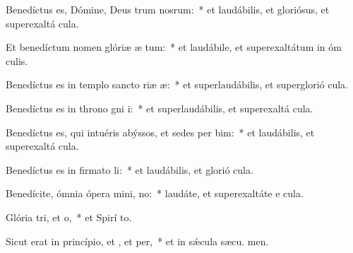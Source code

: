 \item Benedíctus es, Dómine, Deus trum nosrum:~* et laudábilis, et gloriósus, et superexaltá  cula.

\item Et benedíctum nomen glóriæ æ tum:~* et laudábile, et superexaltátum in óm culis.

\item Benedíctus es in templo sancto riæ æ:~* et superlaudábilis, et superglorió  cula.

\item Benedíctus es in throno gni i:~* et superlaudábilis, et superexaltá  cula.

\item Benedíctus es, qui intuéris abýssos, et sedes per bim:~* et laudábilis, et superexaltá  cula.

\item Benedíctus es in firmato li:~* et laudábilis, et glorió  cula.

\item Benedícite, ómnia ópera mini, no:~* laudáte, et superexaltáte e  cula.

\item Glória tri, et o,~* et Spirí to.

\item Sicut erat in princípio, et , et per,~* et in sǽcula sæcu. men.